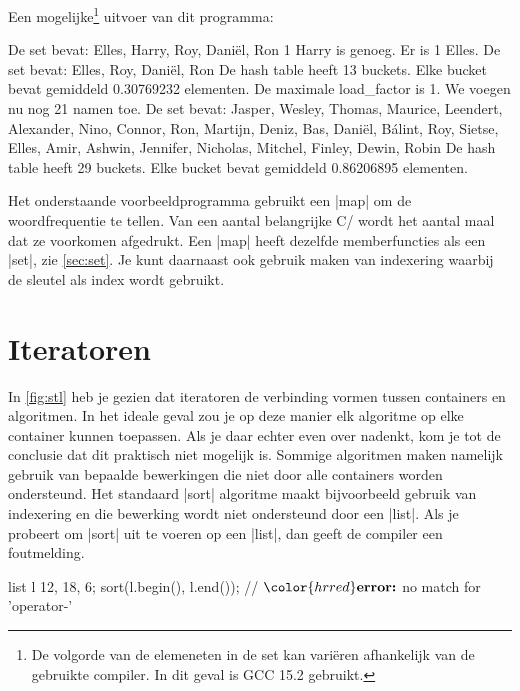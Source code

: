 \begin{cpplstShortInline}
Een mogelijke\footnote{%
	De volgorde van de elemeneten in de set kan variëren afhankelijk van de gebruikte compiler.
	In dit geval is GCC 15.2 gebruikt.%
} uitvoer van dit programma:

\begin{cpplstfragment}[language=]
De set bevat: Elles, Harry, Roy, Daniël, Ron
1 Harry is genoeg.
Er is 1 Elles.
De set bevat: Elles, Roy, Daniël, Ron
De hash table heeft 13 buckets.
Elke bucket bevat gemiddeld 0.30769232 elementen.
De maximale load_factor is 1.
We voegen nu nog 21 namen toe.
De set bevat: Jasper, Wesley, Thomas, Maurice, Leendert, Alexander, Nino, Connor, Ron, Martijn, Deniz, Bas, Daniël, Bálint, Roy, Sietse, Elles, Amir, Ashwin, Jennifer, Nicholas, Mitchel, Finley, Dewin, Robin
De hash table heeft 29 buckets.
Elke bucket bevat gemiddeld 0.86206895 elementen.
\end{cpplstfragment}

\label{sec:vbmap}
Het onderstaande voorbeeldprogramma  gebruikt een |map| om de woordfrequentie te tellen.
Van een aantal belangrijke C/\Cpp{}  wordt het aantal maal dat ze voorkomen afgedrukt.
Een |map| heeft dezelfde memberfuncties als een |set|, zie \cref{sec:set}.
Je kunt daarnaast ook gebruik maken van indexering waarbij de sleutel als index wordt gebruikt.


\chapter{Iteratoren}
\label{sec:iteratoren}
In \cref{fig:stl} heb je gezien dat iteratoren de verbinding vormen tussen containers en algoritmen.
In het ideale geval zou je op deze manier elk algoritme op elke container kunnen toepassen.
Als je daar echter even over nadenkt, kom je tot de conclusie dat dit praktisch niet mogelijk is.
Sommige algoritmen maken namelijk gebruik van bepaalde bewerkingen die niet door alle containers worden ondersteund.
Het standaard |sort| algoritme maakt bijvoorbeeld gebruik van indexering en die bewerking wordt niet ondersteund door een |list|.
Als je probeert om |sort| uit te voeren op een |list|, dan geeft de compiler een foutmelding.

\begin{cpplstfragment}[mathescape=true]
list l {12, 18, 6};
sort(l.begin(), l.end()); // $\color{hrred}\textbf{error:}$ no match for 'operator-'
\end{cpplstfragment}


\end{cpplstShortInline}
